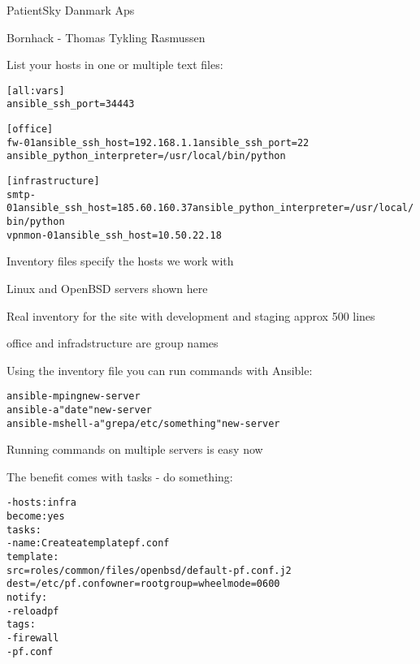 \documentclass[18pt,landscape,a4paper,footrule]{foils}
\begin{document}

\begin{list2}
\item PatientSky Danmark Aps
\item Bornhack - Thomas Tykling Rasmussen
\end{list2}


List your hosts in one or multiple text files:
\begin{alltt}\footnotesize
[all:vars]
ansible_ssh_port=34443

[office]
fw-01 ansible_ssh_host=192.168.1.1 ansible_ssh_port=22
ansible_python_interpreter=/usr/local/bin/python

[infrastructure]
smtp-01     ansible_ssh_host=185.60.160.37 ansible_python_interpreter=/usr/local/bin/python
vpnmon-01   ansible_ssh_host=10.50.22.18

\end{alltt}

\begin{list2}
\item Inventory files specify the hosts we work with
\item Linux and OpenBSD servers shown here
\item Real inventory for the site with development and staging approx 500 lines
\item office and infradstructure are group names
\end{list2}



Using the inventory file you can run commands with Ansible:

\begin{alltt}\footnotesize
  ansible -m ping new-server
  ansible -a "date" new-server
  ansible -m shell -a "grep a /etc/something" new-server
\end{alltt}

\begin{list2}
\item Running commands on multiple servers is easy now
\end{list2}



The benefit comes with tasks - do something:

\begin{alltt}\footnotesize
  - hosts: infra
    become: yes
    tasks:
    - name: Create a template pf.conf
      template:
        src=roles/common/files/openbsd/default-pf.conf.j2
        dest=/etc/pf.conf owner=root group=wheel mode=0600
     notify:
        - reload pf
      tags:
        - firewall
        - pf.conf
\end{alltt}
\end{document}
